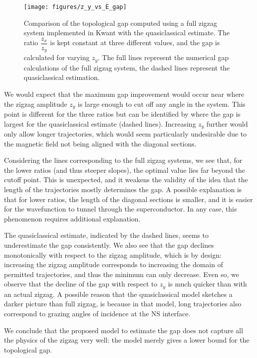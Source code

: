 			\begin{figure}[!htb]
			\centering
			\texttt{[image: figures/z\_y\_vs\_E\_gap]}
			\caption{Comparison of the topological gap computed using a full zigzag system implemented in Kwant with the quasiclassical estimate.
			The ratio $\dfrac{z_x}{z_y}$ is kept constant at three different values, and the gap is calculated for varying $z_y$.
			The full lines represent  the numerical gap calculations of the full zigzag system, the dashed lines represent the quasiclassical estimation.}
			\label{fig:quasiclassical_approximation}
			\end{figure}

			We would expect that the maximum gap improvement would occur near where the zigzag amplitude $z_y$ is large enough to cut off any angle in the system.
			This point is different for the three ratios but can be identified by where the gap is largest for the quasiclassical estimate (dashed lines).
			Increasing $z_y$ further would only allow longer trajectories, which would seem particularly undesirable due to the magnetic field not being aligned with the diagonal sections.

			Considering the lines corresponding to the full zigzag systems, we see that, for the lower ratios (and thus steeper slopes), the optimal value lies far beyond the cutoff point.
			This is unexpected, and it weakens the validity of the idea that the length of the trajectories mostly determines the gap.
			A possible explanation is that for lower ratios, the length of the diagonal sections is smaller, and it is easier for the wavefunction to tunnel through the superconductor.
			In any case, this phenomenon requires additional explanation.

			The quasiclassical estimate, indicated by the dashed lines, seems to underestimate the gap consistently.
			We also see that the gap declines monotonically with respect to the zigzag amplitude, which is by design: increasing the zigzag amplitude corresponds to increasing the domain of permitted trajectories, and thus the minimum can only decrease.
			Even so, we observe that the decline of the gap with respect to $z_y$ is much quicker than with an actual zigzag.
			A possible reason that the quasiclassical model sketches a darker picture than full zigzag, is because in that model, long trajectories also correspond to grazing angles of incidence at the NS interface.

			We conclude that the proposed model to estimate the gap does not capture all the physics of the zigzag very well: the model merely gives a lower bound for the topological gap.
